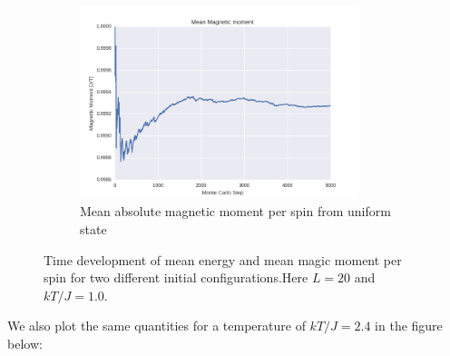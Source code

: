 \documentclass[a4paper, 10pt]{article}
\begin{document}
\begin{figure}[!ht]
    ~ 
    \begin{subfigure}[H!]{0.5\textwidth}
        \centering
        \includegraphics[height=2.2in]{meanMagMomWUpStart.png}
        \caption{Mean absolute magnetic moment per spin from uniform state}
    \end{subfigure}
      \caption{Time development of mean energy and mean magic moment per spin for two different initial configurations.Here $L=20$ and $kT/J=1.0$.}\label{fig:20x20_Sweep_T_1}
\end{figure}
We also plot the same quantities for a temperature of $kT/J=2.4$ in the figure below:
\end{document}
